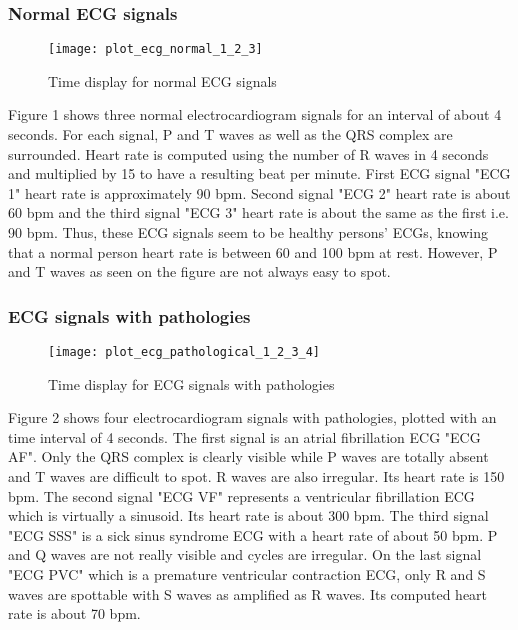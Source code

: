 \documentclass[11pt]{article}
\begin{document}
	\subsubsection{Normal ECG signals}
	
	\begin{figure}[H]
	\centering
	\texttt{[image: plot\_ecg\_normal\_1\_2\_3]}
	\caption{Time display for normal ECG signals}
	\end{figure}
	
Figure 1 shows three normal electrocardiogram signals for an interval of about 4 seconds. For each signal, P and T waves as well as the QRS complex are surrounded. Heart rate is computed using the number of R waves in 4 seconds and multiplied by 15 to have a resulting beat per minute. First ECG signal "ECG 1" heart rate is approximately 90 bpm. Second signal "ECG 2" heart rate is about 60 bpm and the third signal "ECG 3" heart rate is about the same as the first i.e. 90 bpm. Thus, these ECG signals seem to be healthy persons' ECGs, knowing that a normal person heart rate is between 60 and 100 bpm at rest.
However, P and T waves as seen on the figure are not always easy to spot.

	
	\subsubsection{ECG signals with pathologies}
	
	\begin{figure}[H]
	\centering
	\texttt{[image: plot\_ecg\_pathological\_1\_2\_3\_4]}
	\caption{Time display for ECG signals with pathologies}
	\end{figure}
	
	Figure 2 shows four electrocardiogram signals with pathologies, plotted with an time interval of 4 seconds. The first signal is an atrial fibrillation ECG "ECG AF". Only the QRS complex is clearly visible while P waves are totally absent and T waves are difficult to spot. R waves are also irregular. Its heart rate is 150 bpm. The second signal "ECG VF" represents a ventricular fibrillation ECG which is virtually a sinusoid. Its heart rate is about 300 bpm. The third signal "ECG SSS" is a sick sinus syndrome ECG with a heart rate of about 50 bpm. P and Q waves are not really visible and cycles are irregular. On the last signal "ECG PVC" which is a premature ventricular contraction ECG, only R and S waves are spottable with S waves as amplified as R waves. Its computed heart rate is about 70 bpm.
	
\end{document}
